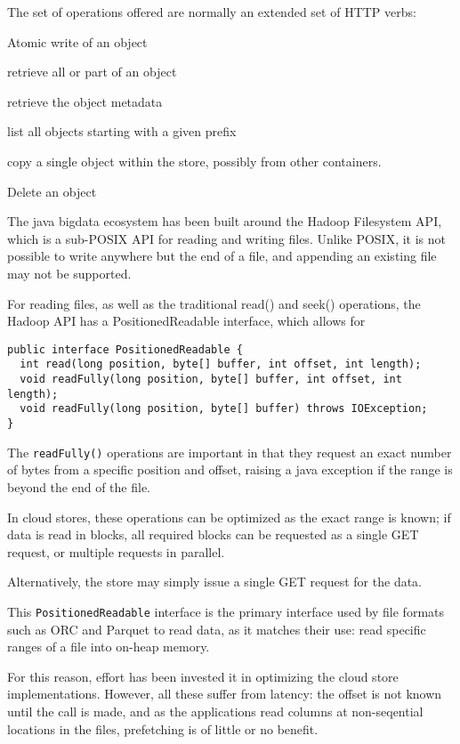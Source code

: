 \documentclass[manuscript]{acmart}
\begin{document}
The set of operations offered are normally an extended set of HTTP verbs:

\begin{description}[leftmargin=8em, style=nextline]
  \item[PUT] Atomic write of an object
  \item[GET] retrieve all or part of an object
  \item[HEAD] retrieve the object metadata
  \item[LIST] list all objects starting with a given prefix
  \item[COPY] copy a single object within the store, possibly from other containers.
  \item[DELETE] Delete an object
\end{description}

The java bigdata ecosystem has been built around the Hadoop Filesystem API,
which is a sub-POSIX API for reading and writing files.
Unlike POSIX, it is not possible to write anywhere but the end of a file,
and appending an existing file may not be supported.

For reading files, as well as the traditional read() and seek() operations,
the Hadoop API has a PositionedReadable interface, which allows for

\begin{verbatim}
public interface PositionedReadable {
  int read(long position, byte[] buffer, int offset, int length);
  void readFully(long position, byte[] buffer, int offset, int length);
  void readFully(long position, byte[] buffer) throws IOException;
}
\end{verbatim}

The \texttt{readFully()} operations are important in that they
request an exact number of bytes from a specific position and offset,
raising a java exception if the range is beyond the end of the file.

In cloud stores, these operations can be optimized as the exact range is known;
if data is read in blocks, all required blocks can be requested as
a single GET request, or multiple requests in parallel.

Alternatively, the store may simply issue a single GET request for the data.

This \texttt{PositionedReadable} interface is the primary interface
used by file formats such as ORC and Parquet to read data, as it matches
their use: read specific ranges of a file into on-heap memory.

For this reason, effort has been invested it in optimizing the
cloud store implementations.
However, all these suffer from latency: the offset is not known until
the call is made, and as the applications read columns at non-seqential
locations in the files, prefetching is of little or no benefit.
\end{document}
